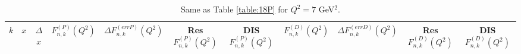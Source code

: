 \documentclass[
twocolumn,
aps,prd,
nofootinbib,
superscriptaddress,
showpacs,ligh
tightenlines, 
]{revtex4}
\begin{document}
\begin{widetext}
\begin{table}[h]
\begin{center}
\begin{tabular}{|c|c|c|c|c|c|c|c|c|c|c|}
\hline
\hline


\end{tabular}

\label{table:34P} 
\end{center}
 \end{table}





\begin{table}[h]
\begin{center}
\caption{Same as Table \ref{table:18P} for $Q^{2} = 7$ GeV$^{2}$.}
\begin{tabular}{|c|c|c|c|c|c|c|c|c|c|c|}
\hline
\hline
     $k$  & $x$   & $\Delta$ $x$   &  $F_{n,k}^{(P)}(Q^{2})$  & $\Delta F_{n,k}^{(err P )}(Q^{2})$ &  Res $F_{n,k}^{(P)}(Q^{2})$  & DIS     $F_{n,k}^{(P)}(Q^{2})$  &   $F_{n,k}^{(D)}(Q^{2})$  & $\Delta F_{n,k}^{(err D )}(Q^{2})$ &  Res $F_{n,k}^{(D)}(Q^{2})$  & DIS     $F_{n,k}^{(D)}(Q^{2})$    \\
\hline
\hline
   

\end{tabular}
\end{center}
\end{table}
\end{widetext}
\end{document}
